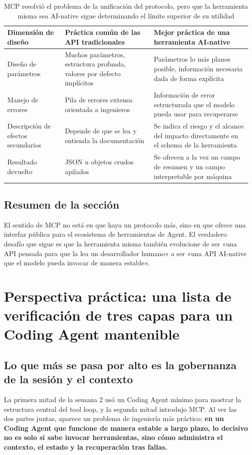 \documentclass[a4paper]{article}
\begin{document}
\begin{table}[H]
\centering
\begin{tabular}{p{3.0cm}p{4.2cm}p{4.0cm}}
\toprule
\textbf{Dimensión de diseño} & \textbf{Práctica común de las API tradicionales} & \textbf{Mejor práctica de una herramienta AI-native} \\
\midrule
Diseño de parámetros & Muchos parámetros, estructura profunda, valores por defecto implícitos & Parámetros lo más planos posible, información necesaria dada de forma explícita \\
Manejo de errores & Pila de errores extensa orientada a ingenieros & Información de error estructurada que el modelo pueda usar para recuperarse \\
Descripción de efectos secundarios & Depende de que se lea y entienda la documentación & Se indica el riesgo y el alcance del impacto directamente en el schema de la herramienta \\
Resultado devuelto & JSON u objetos crudos apilados & Se ofrecen a la vez un campo de resumen y un campo interpretable por máquina \\
\bottomrule
\end{tabular}
\caption{MCP resolvió el problema de la unificación del protocolo, pero que la herramienta misma sea AI-native sigue determinando el límite superior de su utilidad}
\end{table}

\subsection{Resumen de la sección}
El sentido de MCP no está en que haya un protocolo más, sino en que ofrece una interfaz pública para el ecosistema de herramientas de Agent. El verdadero desafío que sigue es que la herramienta misma también evolucione de ser «una API pensada para que la lea un desarrollador humano» a ser «una API AI-native que el modelo pueda invocar de manera estable».
\section{Perspectiva práctica: una lista de verificación de tres capas para un Coding Agent mantenible}

\subsection{Lo que más se pasa por alto es la gobernanza de la sesión y el contexto}
La primera mitad de la semana 2 usó un Coding Agent mínimo para mostrar la estructura central del tool loop, y la segunda mitad introdujo MCP. Al ver las dos partes juntas, aparece un problema de ingeniería más práctico: \textbf{en un Coding Agent que funcione de manera estable a largo plazo, lo decisivo no es solo si sabe invocar herramientas, sino cómo administra el contexto, el estado y la recuperación tras fallas.}
\end{document}
